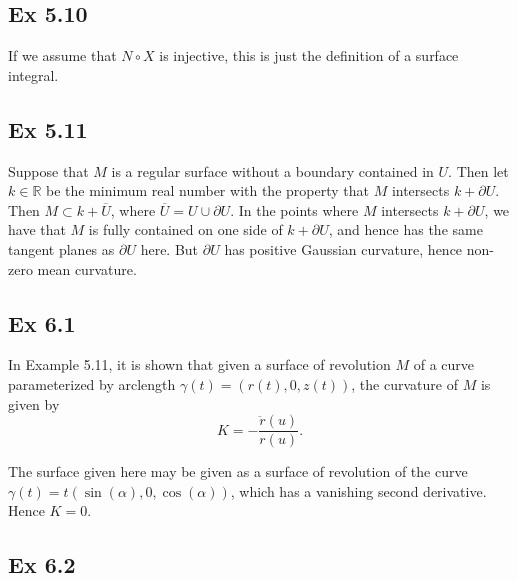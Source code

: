 \documentclass{article}
\theoremstyle{definition}
\newcommand{\R}{\mathbb{R}}
\begin{document}
\subsection*{Ex 5.10}

If we assume that $N \circ X$ is injective, this is just the definition of a
surface integral.

\subsection*{Ex 5.11}

Suppose that $M$ is a regular surface without a boundary contained in $U$. Then
let $k \in \R$ be the minimum real number with the property that $M$ intersects
$k + \partial U$. Then $M \subset k + \overline{U}$, where $\overline{U} = U
\cup \partial U$. In the points where $M$ intersects $k + \partial U$, we have
that $M$ is fully contained on one side of $k + \partial U$, and hence has the
same tangent planes as $\partial U$ here. But $\partial U$ has positive
Gaussian curvature, hence non-zero mean curvature. 

\subsection*{Ex 6.1}

In Example 5.11, it is shown that given a surface of revolution $M$
of a curve parameterized by arclength $\gamma(t) = (r(t), 0, z(t))$,
the curvature of $M$ is given by 
\[
	K = - \frac{\ddot{r}(u)}{r(u)}.
\] 

The surface given here may be given as a surface of revolution of the curve
$\gamma(t) = t(\sin(\alpha), 0, \cos(\alpha))$, which has a vanishing second
derivative. Hence $K = 0$.

\subsection*{Ex 6.2}
\end{document}
